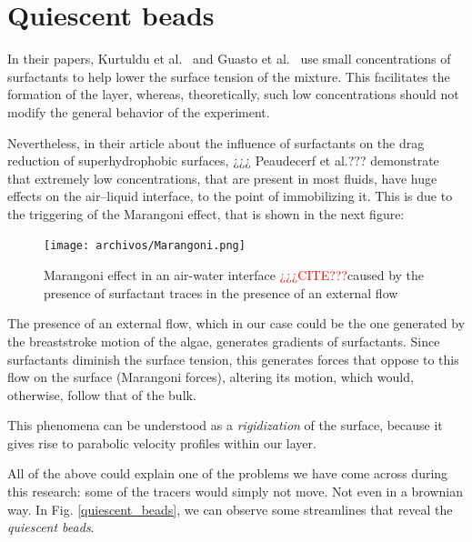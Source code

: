 \section{Quiescent beads}
 
In their papers, Kurtuldu et al.~\cite{Kurtuldu2011} and Guasto et al.~\cite{Guasto} use small concentrations of surfactants to help lower the surface tension of the mixture. This facilitates the formation of the layer, whereas, theoretically, such low concentrations should not modify the general behavior of the experiment.

Nevertheless, in their article about the influence of surfactants on the drag
reduction of superhydrophobic surfaces, ¿¿¿ Peaudecerf et al.??? demonstrate that extremely low concentrations, that are present in most fluids, have huge effects on the air–liquid interface, to the point of immobilizing it. This is due to the triggering of the Marangoni effect, that is shown in the next figure:

\begin{figure}[H]
	\centering
	\texttt{[image: archivos/Marangoni.png]}
	\caption[Caption]{Marangoni effect in an air-water interface \textcolor{red}{¿¿¿CITE???}\protect\footnotemark caused by the presence of surfactant traces in the presence of an external flow}
	\label{Marangoni}
\end{figure}


The presence of an external flow, which in our case could be the one generated by the breaststroke motion of the algae, generates gradients of surfactants. Since surfactants diminish the surface tension, this generates forces that oppose to this flow on the surface (Marangoni forces), altering its motion, which would, otherwise, follow that of the bulk.

This phenomena can be understood as a \textit{rigidization} of the surface, because it gives rise to parabolic velocity profiles within our layer.

All of the above could explain one of the problems we have come across during this research: some of the tracers would simply not move. Not even in a brownian way. In Fig. \ref{quiescent_beads}, we can observe some streamlines that reveal the \textit{quiescent beads}.  

